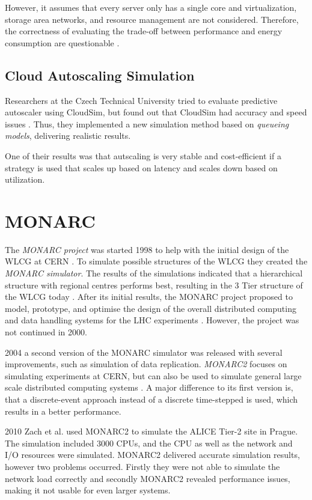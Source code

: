 However, it assumes that every server only has a single core and virtualization, storage area networks, and resource management are not considered. Therefore, the correctness of evaluating the trade-off between performance and energy consumption are questionable \cite{survey_clouds}.

\subsection{Cloud Autoscaling Simulation}
Researchers at the Czech Technical University tried to evaluate predictive autoscaler using CloudSim, but found out that CloudSim had accuracy and speed issues \cite{autoscale_cloud}. Thus, they implemented a new simulation method based on \textit{queueing models}, delivering realistic results. 

One of their results was that autscaling is very stable and cost-efficient if a strategy is used that scales up based on latency and scales down based on utilization. 

\section{MONARC}
The \textit{MONARC project} was started 1998 to help with the initial design of the WLCG at CERN \cite{monarc2000models}.
To simulate possible structures of the WLCG they created the \textit{MONARC simulator}.
The results of the simulations indicated that a hierarchical structure with regional centres performs best, resulting in the 3 Tier structure of the WLCG today \cite{morita2001validation}. 
After its initial results, the MONARC project proposed to model, prototype, and optimise the design of the overall distributed computing and data handling systems for the LHC experiments \cite{monarc2000models}.
However, the project was not continued in 2000.

2004 a second version of the MONARC simulator was released with several improvements, such as simulation of data replication. \textit{MONARC2} focuses on simulating experiments at CERN, but can also be used to simulate general large scale distributed computing systems \cite{legrand2003monarc}. A major difference to its first version is, that a discrete-event approach instead of a discrete time-stepped is used, which results in a better performance.

2010 Zach et al. \cite{1742-6596-331-7-072038} used MONARC2 to simulate the ALICE Tier-2 site in Prague. The simulation included 3000 CPUs, and the CPU as well as the network and I/O resources were simulated. MONARC2 delivered accurate simulation results, however two problems occurred. Firstly they were not able to simulate the network load correctly and secondly MONARC2 revealed performance issues, making it not usable for even larger systems.

